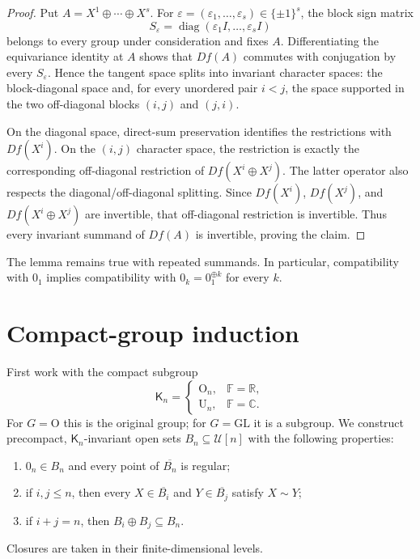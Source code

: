 \documentclass[11pt]{article}
\newcommand{\U}{\mathcal U}
\newcommand{\F}{\mathbb F}
\newcommand{\K}{\mathsf K}
\newcommand{\op}{\mathbin{\oplus}}
\begin{document}
\begin{proof}
Put $A=X^1\op\cdots\op X^s$.  For
$\varepsilon=(\varepsilon_1,\ldots,\varepsilon_s)\in\{\pm1\}^s$, the block
sign matrix
\[
 S_\varepsilon=\operatorname{diag}(\varepsilon_1I,\ldots,
 \varepsilon_sI)
\]
belongs to every group under consideration and fixes $A$.  Differentiating
the equivariance identity at $A$ shows that $Df(A)$ commutes with conjugation
by every $S_\varepsilon$.  Hence the tangent space splits into invariant
character spaces: the block-diagonal space and, for every unordered pair
$i<j$, the space supported in the two off-diagonal blocks $(i,j)$ and $(j,i)$.

On the diagonal space, direct-sum preservation identifies the restrictions
with $Df(X^i)$.  On the $(i,j)$ character space, the restriction is exactly
the corresponding off-diagonal restriction of $Df(X^i\op X^j)$.  The latter
operator also respects the diagonal/off-diagonal splitting.  Since
$Df(X^i)$, $Df(X^j)$, and $Df(X^i\op X^j)$ are invertible, that off-diagonal
restriction is invertible.  Thus every invariant summand of $Df(A)$ is
invertible, proving the claim.
\end{proof}

The lemma remains true with repeated summands.  In particular, compatibility
with $0_1$ implies compatibility with $0_k=0_1^{\oplus k}$ for every $k$.

\section{Compact-group induction}

First work with the compact subgroup
\[
 \K_n=\begin{cases}
 \mathrm O_n,&\F=\mathbb R,\\
 \mathrm U_n,&\F=\mathbb C.
 \end{cases}
\]
For $G=\mathrm O$ this is the original group; for $G=\mathrm{GL}$ it is a
subgroup.  We construct precompact, $\K_n$-invariant open sets
$B_n\subseteq\U[n]$ with the following properties:
\begin{enumerate}
\item $0_n\in B_n$ and every point of $\overline{B_n}$ is regular;
\item if $i,j\leq n$, then every
      $X\in\overline{B_i}$ and $Y\in\overline{B_j}$ satisfy $X\sim Y$;
\item if $i+j=n$, then $B_i\op B_j\subseteq B_n$.
\end{enumerate}
Closures are taken in their finite-dimensional levels.
\end{document}
